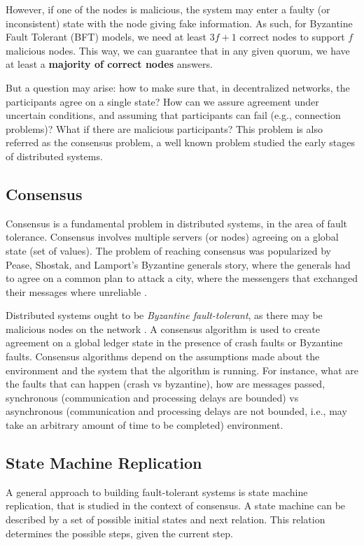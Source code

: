 \documentclass[12pt,a4paper]{article}
\begin{document}
However, if one of the nodes is malicious, the system may enter a faulty (or inconsistent) state with the node giving fake information. As such, for Byzantine Fault Tolerant (BFT) models, we need at least $3f+1$ correct nodes to support $f$ malicious nodes. This way, we can guarantee that in any given quorum, we have at least a \textbf{majority of correct nodes} answers.


But a question may arise: how to make sure that, in decentralized networks, the participants agree on a single state? How can we assure agreement under uncertain conditions, and assuming that participants can fail (e.g., connection problems)? What if there are malicious participants? This problem is also referred as the consensus problem, a well known problem studied the early stages of distributed systems.


\subsection{Consensus}
Consensus is a fundamental problem in distributed systems, in the area of fault tolerance. Consensus involves multiple servers (or nodes) agreeing on a global state (set of values). %
The problem of reaching consensus was popularized by Pease, Shostak, and Lamport's Byzantine generals story, where the generals had to agree on a common plan to attack a city, where the messengers that exchanged their messages where unreliable \cite{byzantine_generals}.  

Distributed systems ought to be \emph{Byzantine fault-tolerant}, as there may be malicious nodes on the network \cite{correia2019byzantine}.  A consensus algorithm is used to create agreement on a global ledger state in the presence of crash faults or Byzantine faults. Consensus algorithms depend on the assumptions made about the environment and the system that the algorithm is running. For instance, what are the faults that can happen (crash vs byzantine), how are messages passed, synchronous (communication and processing delays are bounded) vs asynchronous (communication and processing delays are not bounded, i.e., may take an arbitrary amount of time to be completed) environment.

\subsection{State Machine Replication}
A general approach to building fault-tolerant systems is state machine replication, that is studied in the context of consensus. A state machine can be described by a set of possible initial states and next relation. This relation determines the possible steps, given the current step.
\end{document}
